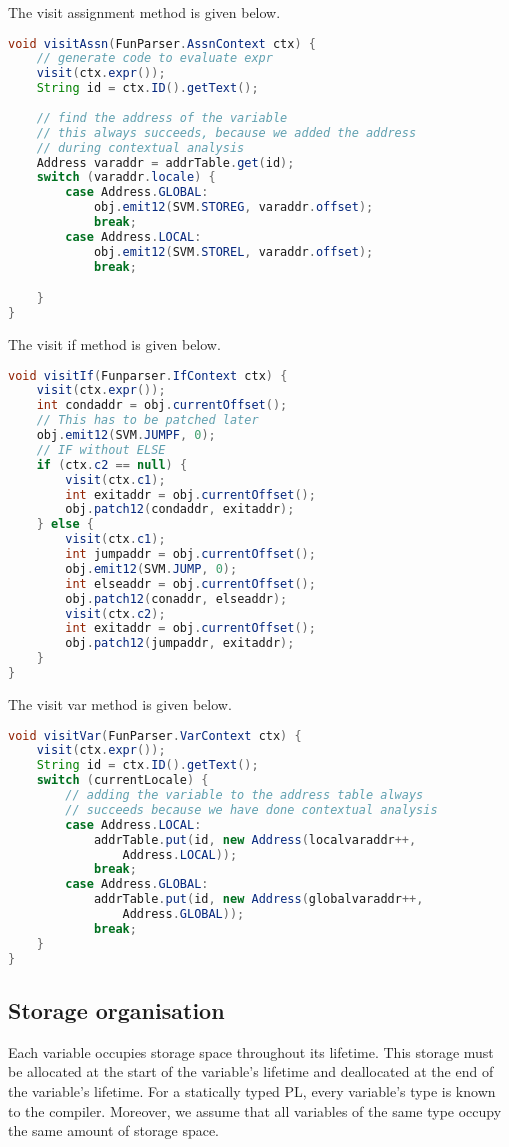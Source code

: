 \documentclass[a4paper, openany]{memoir}
\begin{document}
The visit assignment method is given below.
\begin{lstlisting}[language=java]
void visitAssn(FunParser.AssnContext ctx) {
    // generate code to evaluate expr
    visit(ctx.expr());
    String id = ctx.ID().getText();
    
    // find the address of the variable
    // this always succeeds, because we added the address
    // during contextual analysis
    Address varaddr = addrTable.get(id);
    switch (varaddr.locale) {
        case Address.GLOBAL:
            obj.emit12(SVM.STOREG, varaddr.offset);
            break;
        case Address.LOCAL:
            obj.emit12(SVM.STOREL, varaddr.offset);
            break;

    }
}
\end{lstlisting}

The visit if method is given below.
\begin{lstlisting}[language=java]
void visitIf(Funparser.IfContext ctx) {
    visit(ctx.expr());
    int condaddr = obj.currentOffset();
    // This has to be patched later
    obj.emit12(SVM.JUMPF, 0);
    // IF without ELSE
    if (ctx.c2 == null) {
        visit(ctx.c1);
        int exitaddr = obj.currentOffset();
        obj.patch12(condaddr, exitaddr);
    } else {
        visit(ctx.c1);
        int jumpaddr = obj.currentOffset();
        obj.emit12(SVM.JUMP, 0);
        int elseaddr = obj.currentOffset();
        obj.patch12(conaddr, elseaddr);
        visit(ctx.c2);
        int exitaddr = obj.currentOffset();
        obj.patch12(jumpaddr, exitaddr);
    }
}
\end{lstlisting}

The visit var method is given below.
\begin{lstlisting}[language=java]
void visitVar(FunParser.VarContext ctx) {
    visit(ctx.expr());
    String id = ctx.ID().getText();
    switch (currentLocale) {
        // adding the variable to the address table always 
        // succeeds because we have done contextual analysis
        case Address.LOCAL:
            addrTable.put(id, new Address(localvaraddr++, 
                Address.LOCAL));
            break;
        case Address.GLOBAL:
            addrTable.put(id, new Address(globalvaraddr++, 
                Address.GLOBAL));
            break;
    }
}
\end{lstlisting}

\subsection{Storage organisation}
Each variable occupies storage space throughout its lifetime. This storage must be allocated at the start of the variable's lifetime and deallocated at the end of the variable's lifetime. For a statically typed PL, every variable's type is known to the compiler. Moreover, we assume that all variables of the same type occupy the same amount of storage space.
\end{document}
